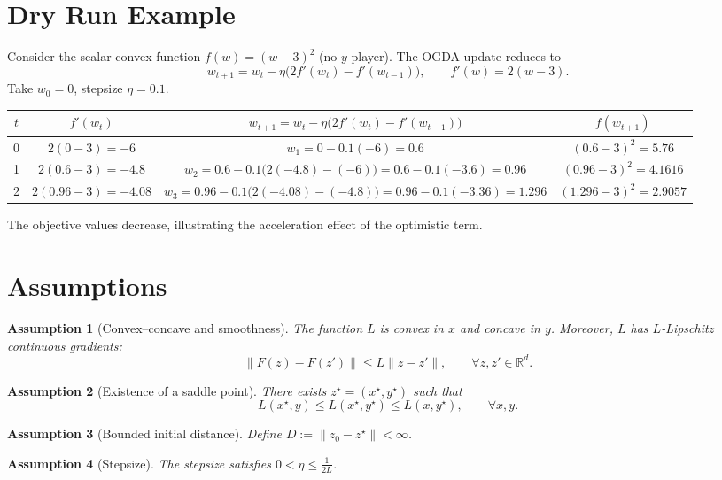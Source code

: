 \documentclass{article}
\newtheorem{assumption}{Assumption}
\begin{document}
\section*{Dry Run Example}
Consider the scalar convex function $f(w)=(w-3)^{2}$ (no $y$-player).  The OGDA update reduces to
\[
w_{t+1}=w_{t}-\eta\bigl(2f'(w_{t})-f'(w_{t-1})\bigr),\qquad 
f'(w)=2(w-3).
\]
Take $w_{0}=0$, stepsize $\eta=0.1$.

\begin{center}
\begin{tabular}{c|c|c|c}
$t$ & $f'(w_{t})$ & $w_{t+1}=w_{t}-\eta\bigl(2f'(w_{t})-f'(w_{t-1})\bigr)$ & $f(w_{t+1})$\\ \hline
0 & $2(0-3)=-6$ & $w_{1}=0-0.1(-6)=0.6$ & $(0.6-3)^{2}=5.76$\\
1 & $2(0.6-3)=-4.8$ & $w_{2}=0.6-0.1\bigl(2(-4.8)-(-6)\bigr)=0.6-0.1(-3.6)=0.96$ & $(0.96-3)^{2}=4.1616$\\
2 & $2(0.96-3)=-4.08$ & $w_{3}=0.96-0.1\bigl(2(-4.08)-(-4.8)\bigr)=0.96-0.1(-3.36)=1.296$ & $(1.296-3)^{2}=2.9057$
\end{tabular}
\end{center}
The objective values decrease, illustrating the acceleration effect of the optimistic term.

\newpage

\section*{Assumptions}
\begin{assumption}[Convex–concave and smoothness]\label{as:convexconcave}
The function $L$ is convex in $x$ and concave in $y$. Moreover, $L$ has $L$-Lipschitz continuous gradients:
\[
\|F(z)-F(z')\|\le L\|z-z'\|,\qquad\forall z,z'\in\mathbb{R}^{d}.
\]
\end{assumption}
\begin{assumption}[Existence of a saddle point]\label{as:saddle}
There exists $z^{\star}=(x^{\star},y^{\star})$ such that
\[
L(x^{\star},y)\le L(x^{\star},y^{\star})\le L(x,y^{\star}),\qquad\forall x,y.
\]
\end{assumption}
\begin{assumption}[Bounded initial distance]\label{as:bounded}
Define $D:=\|z_{0}-z^{\star}\|<\infty$.
\end{assumption}
\begin{assumption}[Stepsize]\label{as:stepsize}
The stepsize satisfies $0<\eta\le \frac{1}{2L}$.
\end{assumption}
\end{document}
